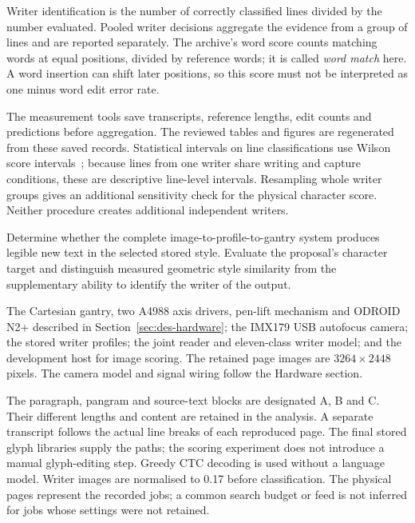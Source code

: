 Writer identification is the number of correctly classified lines divided by the number evaluated. Pooled writer decisions aggregate the evidence from a group of lines and are reported separately. The archive's word score counts matching words at equal positions, divided by reference words; it is called \emph{word match} here. A word insertion can shift later positions, so this score must not be interpreted as one minus word edit error rate.

The measurement tools save transcripts, reference lengths, edit counts and predictions before aggregation. The reviewed tables and figures are regenerated from these saved records. Statistical intervals on line classifications use Wilson score intervals~\cite[pp.~209--212]{wilson1927}; because lines from one writer share writing and capture conditions, these are descriptive line-level intervals. Resampling whole writer groups gives an additional sensitivity check for the physical character score. Neither procedure creates additional independent writers.

Determine whether the complete image-to-profile-to-gantry system produces legible new text in the selected stored style. Evaluate the proposal's character target and distinguish measured geometric style similarity from the supplementary ability to identify the writer of the output.

The Cartesian gantry, two A4988 axis drivers, pen-lift mechanism and ODROID N2+ described in Section~\ref{sec:des-hardware}; the IMX179 USB autofocus camera; the stored writer profiles; the joint reader and eleven-class writer model; and the development host for image scoring. The retained page images are $3264\times2448$ pixels. The camera model and signal wiring follow the Hardware section.

The paragraph, pangram and source-text blocks are designated A, B and C. Their different lengths and content are retained in the analysis. A separate transcript follows the actual line breaks of each reproduced page. The final stored glyph libraries supply the paths; the scoring experiment does not introduce a manual glyph-editing step. Greedy CTC decoding is used without a language model. Writer images are normalised to 0.17 before classification. The physical pages represent the recorded jobs; a common search budget or feed is not inferred for jobs whose settings were not retained.

